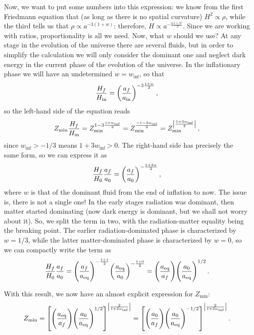 \documentclass[main.tex]{subfiles}
\begin{document}
Now, we want to put some numbers into this expression: we know from the first Friedmann equation that (as long as there is no spatial curvature) \(H^2 \propto \rho \), while the third tells us that \(\rho \propto a^{-3 (1+ w)}\): therefore, \(H \propto a^{- 3 \frac{1 + w}{2}}\). Since we are working with ratios, proportionality is all we need. 
Now, what \(w\) should we use? At any stage in the evolution of the universe there are several fluids, but in order to simplify the calculation we will only consider the dominant one and neglect dark energy in the current phase of the evolution of the universe. 
In the inflationary phase we will have an undetermined \(w = w _{\text{inf}}\), so that 
%
\begin{align}
\frac{H_f}{H _{\text{in}}} = \qty(\frac{a_f}{a _{\text{in}}})^{- 3\frac{1+w}{2}}
\,,
\end{align}
%
so the left-hand side of the equation reads 
%
\begin{align}
Z _{\text{min}} \frac{H_f}{H _{\text{in}}} 
= Z _{\text{min}}^{1 - 3 \frac{1+w _{\text{inf}}}{2}} 
= Z _{\text{min}}^{\frac{-1 - 3w _{\text{inf}}}{2}} 
= Z _{\text{min}}^{\abs{\frac{1 + 3w _{\text{inf}}}{2}}} 
\,,
\end{align}
%
since \(w _{\text{inf}} > - 1/3 \) means \(1 + 3w _{\text{inf}} > 0\).
The right-hand side has precisely the same form, so we can express it as 
%
\begin{align}
\frac{H_f}{H_0 } \frac{a_f}{a_0 } = \qty(\frac{a_f}{a_0 })^{- \frac{1 + 3 w}{2}}
\,,
\end{align}
%
where \(w\) is that of the dominant fluid from the end of inflation to now. The issue is, there is not a single one! In the early stages radiation was dominant, then matter started dominating (now dark energy is dominant, but we shall not worry about it).
So, we split the term in two, with the radiation-matter equality being the breaking point. The earlier radiation-dominated phase is characterized by \(w = 1/3\), while the latter matter-dominated phase is characterized by \(w = 0\), so we can compactly write the term as 
%
\begin{align}
\frac{H_f}{H_0 } \frac{a_f}{a_0 } = \qty(\frac{a_f}{a _{\text{eq}}})^{- \frac{1 + 1}{2}} \qty(\frac{a _{\text{eq}}}{a_0 })^{- \frac{1 + 0}{2}} 
= \qty(\frac{a _{\text{eq}}}{a_f}) \qty(\frac{a_0}{a _{\text{eq}}})^{1/2}
\,.
\end{align}
%

With this result, we now have an almost explicit expression for \(Z _{\text{min}}\): 
%
\begin{align}
Z _{\text{min}}
= \qty[\qty(\frac{a _{\text{eq}}}{a_f}) \qty(\frac{a_0}{a _{\text{eq}}})^{1/2}]^{\abs{ \frac{2}{1 + 3 w _{\text{inf}}}}}
= \qty[\qty(\frac{a _0}{a_f}) \qty(\frac{a_0}{a _{\text{eq}}})^{-1/2}]^{\abs{ \frac{2}{1 + 3 w _{\text{inf}}}}}
\,.
\end{align}
\end{document}
